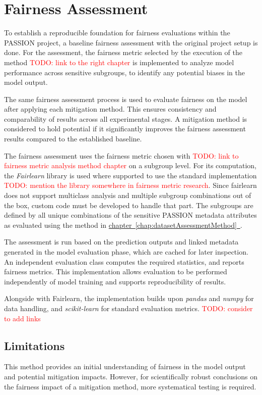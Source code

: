 \documentclass[12pt, a4paper, oneside]{book}   	%
\renewcommand{\todo}[1]{\textcolor{red}{TODO: #1}}
\newcommand{\linkchap}[1]{\hyperref[#1]{chapter~\ref{#1}~\nameref{#1}}}
\begin{document}
				
		\section{Fairness Assessment}\label{chap:fairnessAssessmentMethod}
		To establish a reproducible foundation for fairness evaluations within the PASSION project, a baseline fairness assessment with the original project setup is done. For the assessment, the fairness metric selected by the execution of the method \todo{link to the right chapter} is implemented to analyze model performance across sensitive subgroups, to identify any potential biases in the model output.
		
		The same fairness assessment process is used to evaluate fairness on the model after applying each mitigation method. This ensures consistency and comparability of results across all experimental stages. A mitigation method is considered to hold potential if it significantly improves the fairness assessment results compared to the established baseline.
		
		The fairness assessment uses the fairness metric chosen with \todo{link to fairness metric analysis method chapter} on a subgroup level. For its computation, the \textit{Fairlearn} library is used where supported to use the standard implementation \todo{mention the library somewhere in fairness metric research}. Since fairlearn does not support multiclass analysis and multiple subgroup combinations out of the box, custom code must be developed to handle that part.
		The subgroups are defined by all unique combinations of the sensitive PASSION metadata attributes as evaluated using the method in \linkchap{chap:datasetAssessmentMethod}.
		
		The assessment is run based on the prediction outputs and linked metadata generated in the model evaluation phase, which are cached for later inspection. An independent evaluation class computes the required statistics, and reports fairness metrics. This implementation allows evaluation to be performed independently of model training and supports reproducibility of results.
		
		Alongside with Fairlearn, the implementation builds upon \textit{pandas} and \textit{numpy} for data handling, and \textit{scikit-learn} for standard evaluation metrics. \todo{consider to add links}
		
		\subsection{Limitations}
			This method provides an initial understanding of fairness in the model output and potential mitigation impacts. However, for scientifically robust conclusions on the fairness impact of a mitigation method, more systematical testing is required.
			
\end{document}
